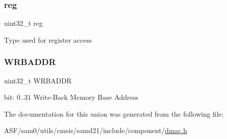 \subsubsection{\texorpdfstring{reg}{reg}}
{\footnotesize\ttfamily uint32\+\_\+t reg}

Type used for register access \mbox{\label{union_d_m_a_c___w_r_b_a_d_d_r___type_abc7ae3c9e65a203411f8987ef5e2c797}} 
\subsubsection{\texorpdfstring{WRBADDR}{WRBADDR}}
{\footnotesize\ttfamily uint32\+\_\+t W\+R\+B\+A\+D\+DR}

bit\+: 0..31 Write-\/\+Back Memory Base Address 

The documentation for this union was generated from the following file\+:\begin{DoxyCompactItemize}
\item 
A\+S\+F/sam0/utils/cmsis/samd21/include/component/\mbox{\hyperlink{component_2dmac_8h}{dmac.\+h}}\end{DoxyCompactItemize}
